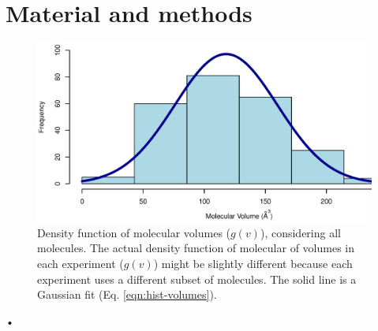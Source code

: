 \documentclass[11pt]{paper} %
\begin{document}















\section{Material and methods}
\begin{figure}
	\centering
	\includegraphics[width=0.5 \textwidth]{fig/hist-volumes}
	\caption{Density function of molecular volumes ($g(v)$), considering all molecules. 
		The actual density function of molecular of volumes in each experiment ($g(v)$) might be slightly different 
		because each experiment uses a different subset of molecules. 
		The solid line is a Gaussian fit (Eq. \ref{eqn:hist-volumes}).}
	\label{fig:hist-volumes}
\end{figure}•
\end{document}
